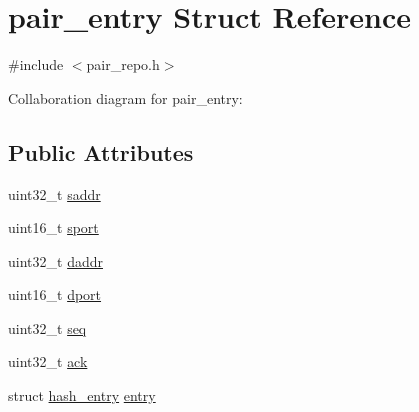 \hypertarget{structpair__entry}{\section{pair\-\_\-entry Struct Reference}
\label{structpair__entry}
}


{\ttfamily \#include $<$pair\-\_\-repo.\-h$>$}



Collaboration diagram for pair\-\_\-entry\-:
\subsection*{Public Attributes}
\begin{DoxyCompactItemize}
\item 
uint32\-\_\-t \hyperlink{structpair__entry_a950b8a14bcfcdba36581823abf211815}{saddr}
\item 
uint16\-\_\-t \hyperlink{structpair__entry_a8a5bd1e674f0da9d918390d1d4750552}{sport}
\item 
uint32\-\_\-t \hyperlink{structpair__entry_a15520a7cf1c9584092b647f92b1866c8}{daddr}
\item 
uint16\-\_\-t \hyperlink{structpair__entry_abfa3c6b00df49f7f2ba40457b0692043}{dport}
\item 
uint32\-\_\-t \hyperlink{structpair__entry_a3fcc67f72e59d19137dfce53543542b2}{seq}
\item 
uint32\-\_\-t \hyperlink{structpair__entry_a5663beddd73df4484d031a1677a4e106}{ack}
\item 
struct \hyperlink{structhash__entry}{hash\-\_\-entry} \hyperlink{structpair__entry_a922a44fbd9f13e69b82957fe3d140648}{entry}
\end{DoxyCompactItemize}


